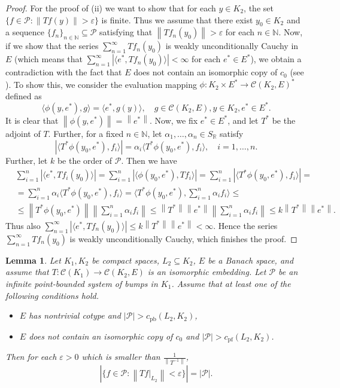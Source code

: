 \documentclass{amsart}
\numberwithin{equation}{section}
\newtheorem{lemma}[thm]{Lemma}
\theoremstyle{definition}
\def\C{\mathcal C}
\def\E{\mathcal E}
\def\e{e^\ast}
\def\E{E^\ast}
\def\ep{\varepsilon}
\def\en{\mathbb N}
\def\er{\mathbb R}
\def\la{\langle}
\def\ra{\rangle}
\newcommand{\norm}[1]{\left\|#1\right\|}
\newcommand{\abs}[1]{\left| #1  \right|}
\begin{document}
\begin{proof}
For the proof of (ii) we want to show that for each $y \in K_2$, the set $\{f \in \mathcal{P}: \norm{Tf(y)}>\ep \}$ is finite. Thus we assume that there exist $y_0 \in K_2$ and a sequence $\{f_n\}_{n \in \en} \subseteq \mathcal{P}$ satisfying that $\norm{Tf_n(y_0)}> \ep$ for each $n \in \en$. Now, if we show that the series $\sum_{n=1}^{\infty} Tf_n(y_0)$ is weakly unconditionally Cauchy in $E$ (which means that $\sum_{n=1}^{\infty} \abs{\la e^*, Tf_n(y_0) \ra}< \infty$ for each $e^* \in \E$), we obtain a contradiction with the fact that $E$ does not contain an isomorphic copy of $c_0$ (see \cite[Theorem 6.7]{morrison2001functional}).
To show this, we consider the evaluation mapping $\phi\colon K_2 \times \E \to \C(K_2, E)^*$ defined as
	\[ \la \phi(y, \e), g \ra=\la \e, g(y) \ra, \quad g \in \C(K_2, E), y \in K_2, \e \in \E.\] 
It is clear that $\norm{\phi(y, \e)}=\norm{\e}$. Now, we fix $e^* \in E^*$, and let $T^*$ be the adjoint of $T$. Further, for a fixed $n \in \en$, let $\alpha_1, \ldots, \alpha_n \in S_{\er}$ satisfy 
	\[\abs{\la T^*\phi(y_0, e^*), f_i \ra}=\alpha_i \la T^*\phi(y_0, e^*), f_i \ra, \quad i=1, \ldots, n.\]
	Further, let $k$ be the order of $\mathcal{P}$. Then we have 
	\begin{equation}
	\nonumber
	\begin{aligned}
	&\sum_{i=1}^{n} \abs{\la e^*, Tf_i(y_0) \ra}=\sum_{i=1}^{n} \abs{\la \phi(y_0, e^*), Tf_i \ra}=
	\sum_{i=1}^{n} \abs{\la T^*\phi(y_0, e^*), f_i \ra}
	=\\&=
	\sum_{i=1}^{n} \alpha_i \la T^*\phi(y_0, e^*), f_i \ra=\la T^*\phi(y_0, e^*), \sum_{i=1}^{n} \alpha_i f_i \ra 
	\leq \\& \leq
	\norm{T^*\phi(y_0, e^*)} \norm{\sum_{i=1}^n \alpha_i f_i}\leq \norm{T^*} \norm{e^*}{\norm{\sum_{i=1}^n \alpha_i f_i}}  \leq  k\norm{T^*}\norm{e^*}. 
	\end{aligned}
	\end{equation}
	Thus also $\sum_{n=1}^{\infty} \abs{\la e^*, Tf_n(y_0) \ra} \leq k\norm{T^*}\norm{e^*}<\infty$. Hence the series $\sum_{n=1}^{\infty} Tf_n(y_0)$ is weakly unconditionally Cauchy, which finishes the proof.
\end{proof}

\begin{lemma}
\label{system}
Let $K_1, K_2$ be compact spaces, $L_2 \subseteq K_2$, $E$ be a Banach space, and assume that $T: \C(K_1) \rightarrow \C(K_2, E)$ is an isomorphic embedding. Let $\mathcal{P}$ be an infinite point-bounded system of bumps in $K_1$. Assume that at least one of the following conditions hold.
\begin{itemize}
\item[(i)] 
$E$ has nontrivial cotype and $\abs{\mathcal{P}}>c_{\text{pb}}(L_2, K_2)$,
\item[(ii)]
$E$ does not contain an isomorphic copy of $c_0$ and $\abs{\mathcal{P}}>c_{\text{pf}}(L_2, K_2)$. 
\end{itemize}
Then for each $\ep>0$ which is smaller than $\frac{1}{\norm{T^{-1}}}$,
\[ \abs{\{ f \in \mathcal{P}: \norm{Tf|_{L_2}} < \ep\}}=\abs{\mathcal{P}}. \]
\end{lemma}
\end{document}
